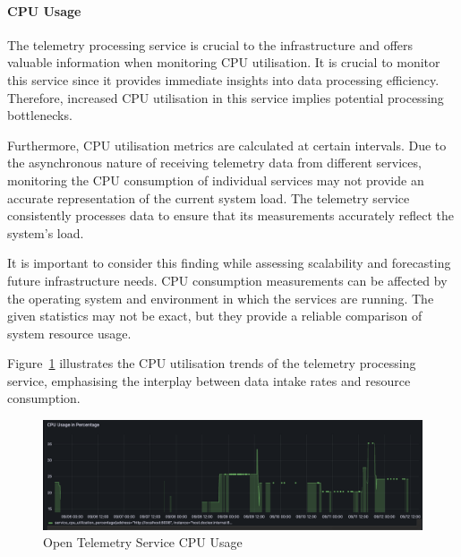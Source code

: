 \documentclass{ieeeaccess}
\begin{document}
\paragraph{CPU Usage} \label{cpuUsageInS1}   

The telemetry processing service is crucial to the infrastructure and offers valuable information when monitoring CPU utilisation. It is crucial to monitor this service since it provides immediate insights into data processing efficiency. Therefore, increased CPU utilisation in this service implies potential processing bottlenecks. 

Furthermore, CPU utilisation metrics are calculated at certain intervals. Due to the asynchronous nature of receiving telemetry data from different services, monitoring the CPU consumption of individual services may not provide an accurate representation of the current system load. The telemetry service consistently processes data to ensure that its measurements accurately reflect the system's load. 

It is important to consider this finding while assessing scalability and forecasting future infrastructure needs. CPU consumption measurements can be affected by the operating system and environment in which the services are running. The given statistics may not be exact, but they provide a reliable comparison of system resource usage.

Figure~\ref{openTelemetryServiceCpuUsage} illustrates the CPU utilisation trends of the telemetry processing service, emphasising the interplay between data intake rates and resource consumption.

\begin{figure}[h]

    \centering

    \includegraphics[width=\textwidth]{images/Open-telemetry-service-CPU-usage.png}

    \caption{Open Telemetry Service CPU Usage}

    \label{openTelemetryServiceCpuUsage}

\end{figure}
\end{document}
